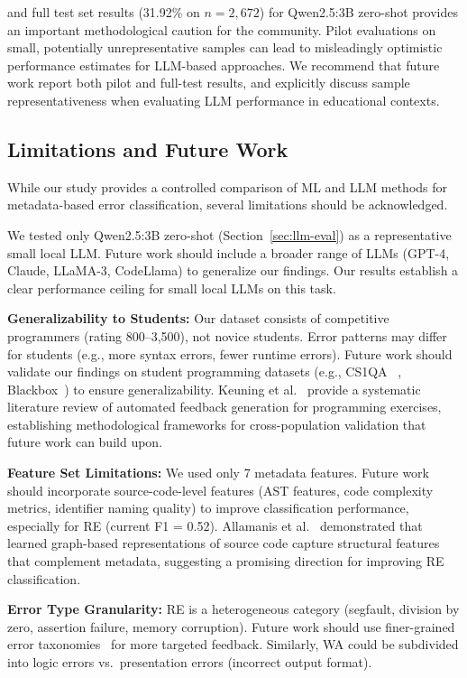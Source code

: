 \documentclass[acmsmall]{acmart}
\begin{document}
and full test set results (31.92\% on $n=2{,}672$) for Qwen2.5:3B zero-shot
provides an important methodological caution for the community.
Pilot evaluations on small, potentially unrepresentative samples can
lead to misleadingly optimistic performance estimates for LLM-based
approaches. We recommend that future work report both pilot and full-test
results, and explicitly discuss sample representativeness when evaluating
LLM performance in educational contexts.

\subsection{Limitations and Future Work}

While our study provides a controlled comparison of ML and LLM methods
for metadata-based error classification, several limitations should be
acknowledged.

We tested only Qwen2.5:3B zero-shot (Section~\ref{sec:llm-eval})
as a representative small local LLM. Future work should include a broader
range of LLMs (GPT-4, Claude, LLaMA-3, CodeLlama) to
generalize our findings. Our results establish a clear performance ceiling for
small local LLMs on this task.

\textbf{Generalizability to Students:} Our dataset consists of competitive
programmers (rating 800--3,500), not novice students. Error patterns may
differ for students (e.g., more syntax errors, fewer runtime errors). Future
work should validate our findings on student programming datasets (e.g., CS1QA
~\cite{lee2022cs1qa}, Blackbox~\cite{brown2014blackbox}) to ensure
generalizability. Keuning et al.~\cite{keuning2017systematic} provide a systematic
literature review of automated feedback generation for programming exercises,
establishing methodological frameworks for cross-population validation that
future work can build upon.

\textbf{Feature Set Limitations:} We used only 7 metadata features. Future
work should incorporate source-code-level features (AST features, code
complexity metrics, identifier naming quality) to improve classification
performance, especially for RE (current F1 = 0.52). Allamanis et al.~\cite{allamanis2018learning} demonstrated that learned
graph-based representations of source code capture structural features that
complement metadata, suggesting a promising direction for improving RE
classification.

\textbf{Error Type Granularity:} RE is a heterogeneous category (segfault,
division by zero, assertion failure, memory corruption). Future work should
use finer-grained error taxonomies~\cite{altadmri2015most} for more targeted
feedback. Similarly, WA could be subdivided into logic errors vs.\ presentation
errors (incorrect output format).
\end{document}
